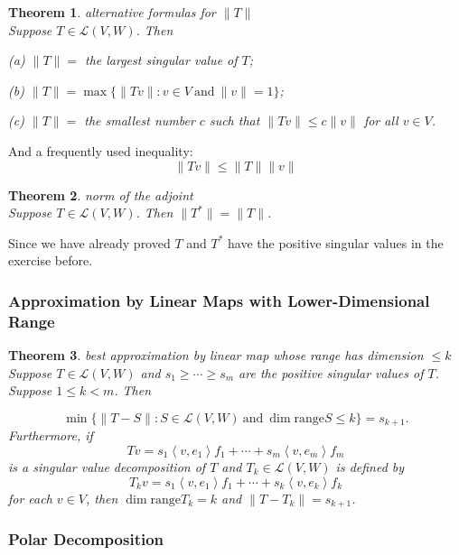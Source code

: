 \documentclass{article}
\newtheorem{theorem}{Theorem}[subsection]
\newcommand{\range}{\text{range}}
\begin{document}
\begin{CJK}{UTF8}{gkai}
\begin{theorem}
    alternative formulas for $\|T\|$\\

    Suppose $T \in \mathcal{L}(V,W)$. Then

    (a) $\|T\| =$ the largest singular value of $T$;

    (b) $\|T\| = \max\{\|Tv\| : v \in V ~\text{and}~ \|v\| = 1\}$;

    (c) $\|T\| =$ the smallest number $c$ such that $\|Tv\| \leq c\|v\|$ for all $v \in V$.
\end{theorem}

And a frequently used inequality:
\[ \|Tv\| \leq \|T\|\|v\|\]

\begin{theorem}
    norm of the adjoint\\

    Suppose $T \in \mathcal{L}(V,W)$. Then $\|T^\ast\| = \|T\|$.
\end{theorem}

Since we have already proved $T$ and $T^\ast$ have the positive singular values in the exercise before.

\subsubsection{Approximation by Linear Maps with Lower-Dimensional Range}

\begin{theorem}
    best approximation by linear map whose range has dimension $\leq k$\\

    Suppose $T \in \mathcal{L}(V,W)$ and $s_1 \geq \cdots \geq s_m$ are the positive singular values of $T$. Suppose $1 \leq k < m$. Then

    \[\min\{\|T -S\| : S \in \mathcal{L}(V,W) ~\text{and}~ \dim \range S \leq k\} = s_{k+1}.\]
    Furthermore, if
    \[Tv =s_1\left<v,e_1\right>f_1 + \cdots+s_m\left<v,e_m\right>f_m\]
    is a singular value decomposition of $T$ and $T_k \in \mathcal{L}(V,W)$ is defined by
    \[T_k v = s_1\left<v,e_1\right>f_1 + \cdots +s_k\left<v,e_k\right>f_k\]
    for each $v \in V$, then $\dim \range T_k = k$ and $\|T -T_k\| = s_{k+1}$.
\end{theorem}

\subsubsection{Polar Decomposition}


\end{CJK}
\end{document}
